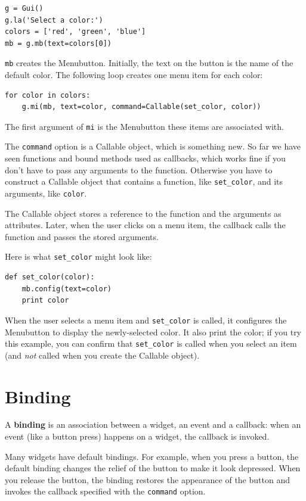 \documentclass[10pt]{book}
\begin{document}
\begin{verbatim}
g = Gui()
g.la('Select a color:')
colors = ['red', 'green', 'blue']
mb = g.mb(text=colors[0])
\end{verbatim}
%
{\tt mb} creates the Menubutton.  Initially, the text on the button is
the name of the default color.  The following loop creates one menu
item for each color:

\begin{verbatim}
for color in colors:
    g.mi(mb, text=color, command=Callable(set_color, color))
\end{verbatim}
%
The first argument of {\tt mi} is the Menubutton these items are
associated with.

The {\tt command} option is a Callable object, which is something new.
So far we have seen functions and bound methods used as callbacks,
which works fine if you don't have to pass any arguments to
the function.  Otherwise you have to construct a Callable object
that contains a function, like \verb"set_color", and its arguments,
like {\tt color}.

The Callable object stores a reference to the function and the
arguments as attributes.  Later, when the user clicks on a menu
item, the callback calls the function and passes the stored
arguments.

Here is what \verb"set_color" might look like:

\begin{verbatim}
def set_color(color):
    mb.config(text=color)
    print color
\end{verbatim}
%
When the user selects a menu item and \verb"set_color" is called,
it configures the Menubutton to display the newly-selected color.
It also print the color; if you try this example, you can confirm that
\verb"set_color" is called when you select an item (and {\em not}
called when you create the Callable object).


\section{Binding}

A {\bf binding} is an association between a widget, an event and a
callback: when an event (like a button press) happens on a widget, the
callback is invoked.

Many widgets have default bindings.  For example, when you press
a button, the default binding changes the relief of the button
to make it look depressed.  When you release the button, the
binding restores the appearance of the button and invokes the
callback specified with the {\tt command} option.
\end{document}
